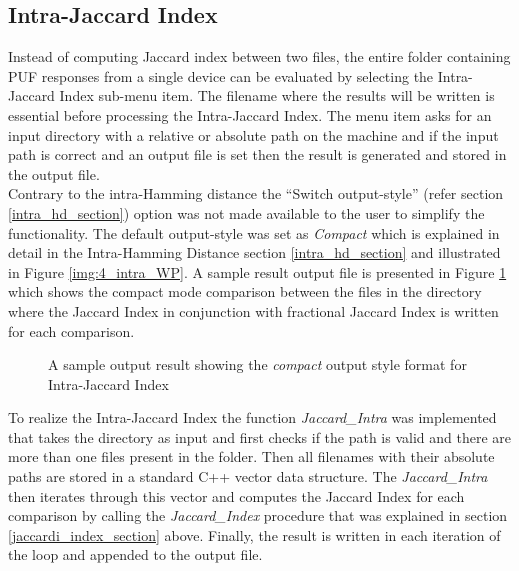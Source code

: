 \subsection{Intra-Jaccard Index}
Instead of computing Jaccard index between two files, the entire folder containing PUF responses from a single device can be evaluated by selecting the Intra-Jaccard Index sub-menu item. The filename where the results will be written is essential before processing the Intra-Jaccard Index. The menu item asks for an input directory with a relative or absolute path on the machine and if the input path is correct and an output file is set then the result is generated and stored in the
output file.\\

Contrary to the intra-Hamming distance the ``Switch output-style'' (refer section \ref{intra_hd_section}) option was not made available to the user to simplify the functionality. The default output-style was set as \emph{Compact} which is explained in detail in the Intra-Hamming Distance section \ref{intra_hd_section} and illustrated in Figure \ref{img:4_intra_WP}. A sample result output file is presented in Figure \ref{img:intra_jaccardi_compact} which shows the compact mode comparison between the files in the
directory where the Jaccard Index in conjunction with fractional Jaccard Index is written for each comparison.\\

\begin{figure}[h]
\centering
{}
\caption{A sample output result showing the \emph{compact} output style format for Intra-Jaccard Index }
\label{img:intra_jaccardi_compact}
\end{figure}

To realize the Intra-Jaccard Index the function \emph{Jaccard\_Intra} was implemented that takes the directory as input and first checks if the path is valid and there are more than one files present in the folder. Then all filenames with their absolute paths are stored in a standard C++ vector data structure. The \emph{Jaccard\_Intra} then iterates through this vector and computes the Jaccard Index for each comparison by calling the \emph{Jaccard\_Index} procedure that was explained in  section
\ref{jaccardi_index_section}
above. Finally, the result is written in each iteration of the loop and appended to the output file.\\

